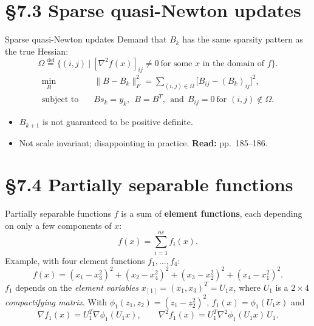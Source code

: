 \documentclass[aspectratio=169,12pt]{beamer}
\newcommand{\gradf}{\nabla f}
\newcommand{\hessf}{\nabla^{2} f}
\newcommand{\readbook}[1]{{\color{red}\textbf{Read:} #1}}
\begin{document}
\section{\S7.3 Sparse quasi-Newton updates}

\begin{frame}{Sparse quasi-Newton updates}
  Demand that $B_{k}$ has the same sparsity pattern as the true Hessian:
  \[ \Omega\overset{\text{def}}{=}\{(i,j)\ |\ [\hessf(x)]_{ij}\ne 0\ \text{for some $x$ in the domain of $f$}\} . \]
  \begin{align}
    \min_{B}\quad & \|B-B_{k}\|_{F}^{2}=\sum_{(i,j)\in\Omega}\big[B_{ij}-(B_{k})_{ij}\big]^{2}, \tag{7.34a}\\
    \text{subject to}\quad & Bs_{k}=y_{k},\ \ B=B^{T},\ \ \text{and}\ \ B_{ij}=0\ \text{for } (i,j)\notin\Omega . \tag{7.34b}
  \end{align}
  \begin{itemize}\setlength\itemsep{0.3em}
    \item $B_{k+1}$ is not guaranteed to be positive definite.
    \item Not scale invariant; \alert{disappointing in practice}. \readbook{pp.~185--186.}
  \end{itemize}
\end{frame}

\section{\S7.4 Partially separable functions}

\begin{frame}{Partially separable functions}
  $f$ is a sum of \textbf{element functions}, each depending on only a few components of $x$:
  \[ f(x)=\sum_{i=1}^{ne}f_{i}(x) . \tag{7.35} \]
  Example, with four element functions $f_{1},\dots,f_{4}$:
  \[
    f(x)=(x_{1}-x_{3}^{2})^{2}+(x_{2}-x_{4}^{2})^{2}+(x_{3}-x_{2}^{2})^{2}+(x_{4}-x_{1}^{2})^{2} .
    \tag{7.36}
  \]
  $f_{1}$ depends on the \emph{element variables} $x_{[1]}=(x_{1},x_{3})^{T}=U_{1}x$, where $U_{1}$ is a
  $2\times 4$ \emph{compactifying matrix}. With $\phi_{1}(z_{1},z_{2})=(z_{1}-z_{2}^{2})^{2}$, $f_{1}(x)=\phi_{1}(U_{1}x)$ and
  \[
    \gradf_{1}(x)=U_{1}^{T}\nabla\phi_{1}(U_{1}x),\qquad
    \hessf_{1}(x)=U_{1}^{T}\nabla^{2}\phi_{1}(U_{1}x)\,U_{1} .
    \tag{7.37}
  \]
\end{frame}
\end{document}
